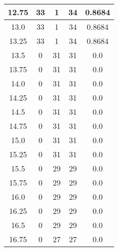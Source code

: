 \documentclass[letterpaper, 12pt]{article}
\begin{document}
\begin{longtable}{|c|c|c|c|c|}
\hline
12.75 & 33 & 1 & 34 & 0.8684 \\
\hline
13.0 & 33 & 1 & 34 & 0.8684 \\
\hline
13.25 & 33 & 1 & 34 & 0.8684 \\
\hline
13.5 & 0 & 31 & 31 & 0.0 \\
\hline
13.75 & 0 & 31 & 31 & 0.0 \\
\hline
14.0 & 0 & 31 & 31 & 0.0 \\
\hline
14.25 & 0 & 31 & 31 & 0.0 \\
\hline
14.5 & 0 & 31 & 31 & 0.0 \\
\hline
14.75 & 0 & 31 & 31 & 0.0 \\
\hline
15.0 & 0 & 31 & 31 & 0.0 \\
\hline
15.25 & 0 & 31 & 31 & 0.0 \\
\hline
15.5 & 0 & 29 & 29 & 0.0 \\
\hline
15.75 & 0 & 29 & 29 & 0.0 \\
\hline
16.0 & 0 & 29 & 29 & 0.0 \\
\hline
16.25 & 0 & 29 & 29 & 0.0 \\
\hline
16.5 & 0 & 29 & 29 & 0.0 \\
\hline
16.75 & 0 & 27 & 27 & 0.0 \\
\hline
\end{longtable}
\end{document}
